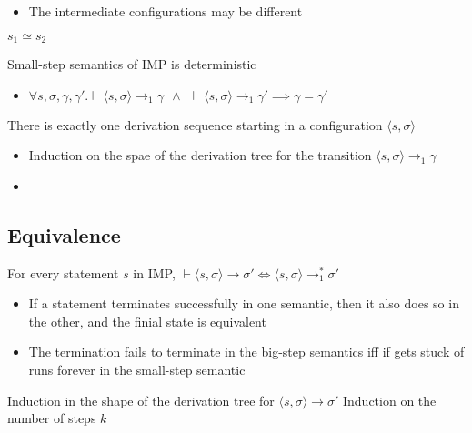 \begin{itemize}
\begin{itemize}
\begin{itemize}
\begin{itemize}
\begin{itemize}
                                    \item The intermediate configurations may be different
                                \end{itemize}
                             $s_1 \simeq s_2$
                        \end{itemize}
                \end{itemize}
                \begin{itemize}
                     Small-step semantics of IMP is deterministic
                        \begin{itemize}
                            \item $\forall s, \sigma, \gamma, \gamma'. \vdash \langle s, \sigma \rangle \to_1 \gamma \ \ \wedge \ \ \vdash \langle s, \sigma \rangle \to_1 \gamma' \implies \gamma = \gamma'$
                        \end{itemize}
                     There is exactly one derivation sequence starting in a configuration $\langle s, \sigma \rangle$
                        \begin{itemize}
                            \item Induction on the spae of the derivation tree for the transition $\langle s, \sigma \rangle \to_1 \gamma$
                        \end{itemize}
                \end{itemize}
        \end{itemize}
     
        \begin{itemize}
            \item
        \end{itemize}
\end{itemize}

\subsection{Equivalence}
\begin{itemize}
     For every statement $s$ in IMP, $\vdash \langle s, \sigma \rangle \to \sigma' \iff \langle s, \sigma \rangle \to_1^* \sigma'$
        \begin{itemize}
            \item If a statement terminates successfully in one semantic, then it also does so in the other, and the finial state is equivalent
            \item The termination fails to terminate in the big-step semantics iff if gets stuck of runs forever in the small-step semantic
        \end{itemize}
        \begin{itemize}
            \ides{$\mathbf{\Rightarrow}$:} Induction in the shape of the derivation tree for $\langle s, \sigma \rangle \to \sigma'$
            \ides{$\mathbf{\Leftarrow}$:} Induction on the number of steps $k$
        \end{itemize}
\end{itemize}
